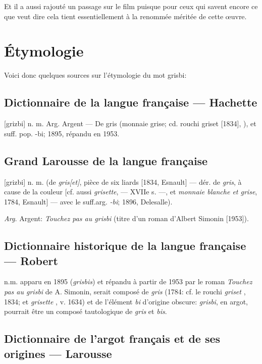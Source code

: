Et il a aussi rajouté un passage sur le film puisque pour ceux qui savent encore ce que  veut dire cela tient essentiellement à la renommée méritée de cette \oe uvre.


\section{Étymologie\label{preamble-etymology}}

Voici donc quelques sources sur l'étymologie  du mot grisbi:


\subsection*{Dictionnaire de la langue française --- Hachette}

[grizbi] n. m. Arg. Argent --- De gris (monnaie grise; cd. rouchi griset [1834], ), et suff. pop. -bi; 1895, répandu en 1953.


\subsection*{Grand Larousse de la langue française}

[grizbi] n. m. (de \emph{gris[et]}, pièce de six liards [1834, Esnault] --- dér. de \emph{gris}, à cause de la couleur [cf. aussi \emph{grisette},  --- XVIIe s. ---, et \emph{monnaie blanche et grise}, 1784, Esnault] --- avec le suff.arg. \emph{-bi}; 1896, Delesalle).

\emph{Arg.} Argent: \emph{Touchez pas au grisbi} (titre d'un roman d'Albert Simonin [1953]).


\subsection*{Dictionnaire historique de la langue française --- Robert}

n.m. apparu en 1895 (\emph{grisbis}) et répandu à partir de 1953 par le roman \emph{Touchez pas au grisbi} de A. Simonin, serait composé de \emph{gris}  (1784: cf. le rouchi \emph{griset} , 1834; et \emph{grisette} , v. 1634) et de l'élément \emph{bi} d'origine obscure: \emph{grisbi},  en argot, pourrait être un composé tautologique de \emph{gris} et \emph{bis}.


\subsection*{Dictionnaire de l'argot français et de ses origines --- Larousse}

